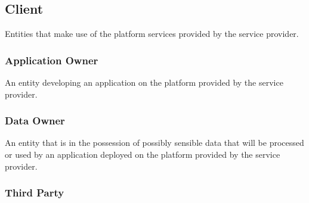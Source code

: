 \subsection{Client}

Entities that make use of the platform services provided by the service
provider.

\subsubsection{Application Owner}

An entity developing an application on the platform provided by the service
provider.

\subsubsection{Data Owner}

An entity that is in the possession of possibly sensible data that will be
processed or used by an application deployed on the platform provided by the
service provider.

\subsubsection{Third Party}
